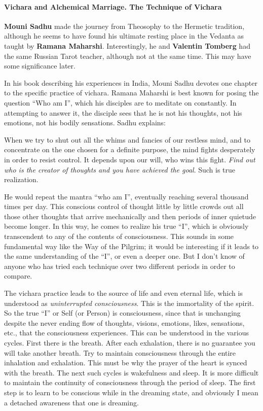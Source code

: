 \paragraph{Vichara and Alchemical Marriage. The Technique of Vichara}


\textbf{Mouni Sadhu} made the journey from Theosophy to the Hermetic tradition, although he seems to have found his ultimate resting place in the Vedanta as taught by \textbf{Ramana Maharshi}. Interestingly, he and \textbf{Valentin Tomberg} had the same Russian Tarot teacher, although not at the same time. This may have some significance later.

In his book describing his experiences in India, Mouni Sadhu devotes one chapter to the specific practice of vichara. Ramana Maharshi is best known for posing the question ``Who am I'', which his disciples are to meditate on constantly. In attempting to answer it, the disciple sees that he is not his thoughts, not his emotions, not his bodily sensations. Sadhu explains:

\begin{quotex}
When we try to shut out all the whims and fancies of our restless mind, and to concentrate on the one chosen for a definite purpose, the mind fights desperately in order to resist control. It depends upon our will, who wins this fight. \emph{Find out who is the creator of thoughts and you have achieved the goal}. Such is true realization.
\end{quotex}

He would repeat the mantra ``who am I'', eventually reaching several thousand times per day. This conscious control of thought little by little crowds out all those other thoughts that arrive mechanically and then periods of inner quietude become longer. In this way, he comes to realize his true ``I'', which is obviously transcendent to any of the contents of consciousness. This sounds in some fundamental way like the Way of the Pilgrim; it would be interesting if it leads to the same understanding of the ``I'', or even a deeper one. But I don't know of anyone who has tried each technique over two different periods in order to compare.

The vichara practice leads to the source of life and even eternal life, which is understood as \emph{uninterrupted consciousness}. This is the immortality of the spirit. So the true ``I'' or Self (or Person) is consciousness, since that is unchanging despite the never ending flow of thoughts, visions, emotions, likes, sensations, etc., that the consciousness experiences. This can be understood in the various cycles. First there is the breath. After each exhalation, there is no guarantee you will take another breath. Try to maintain consciousness through the entire inhalation and exhalation. This must be why the prayer of the heart is synced with the breath. The next such cycles is wakefulness and sleep. It is more difficult to maintain the continuity of consciousness through the period of sleep. The first step is to learn to be conscious while in the dreaming state, and obviously I mean a detached awareness that one is dreaming.

